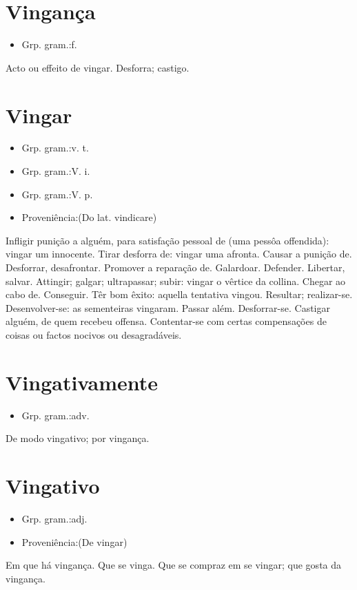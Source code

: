 \documentclass{article}
\begin{document}
\section{Vingança}
\begin{itemize}
\item {Grp. gram.:f.}
\end{itemize}
Acto ou effeito de vingar.
Desforra; castigo.
\section{Vingar}
\begin{itemize}
\item {Grp. gram.:v. t.}
\end{itemize}
\begin{itemize}
\item {Grp. gram.:V. i.}
\end{itemize}
\begin{itemize}
\item {Grp. gram.:V. p.}
\end{itemize}
\begin{itemize}
\item {Proveniência:(Do lat. \textunderscore vindicare\textunderscore )}
\end{itemize}
Infligir punição a alguém, para satisfação pessoal de (uma pessôa offendida): \textunderscore vingar um innocente\textunderscore .
Tirar desforra de: \textunderscore vingar uma afronta\textunderscore .
Causar a punição de.
Desforrar, desafrontar.
Promover a reparação de.
Galardoar.
Defender.
Libertar, salvar.
Attingir; galgar; ultrapassar; subir: \textunderscore vingar o vêrtice da collina\textunderscore .
Chegar ao cabo de.
Conseguir.
Têr bom êxito: \textunderscore aquella tentativa vingou\textunderscore .
Resultar; realizar-se.
Desenvolver-se: \textunderscore as sementeiras vingaram\textunderscore .
Passar além.
Desforrar-se.
Castigar alguém, de quem recebeu offensa.
Contentar-se com certas compensações de coisas ou factos nocivos ou desagradáveis.
\section{Vingativamente}
\begin{itemize}
\item {Grp. gram.:adv.}
\end{itemize}
De modo vingativo; por vingança.
\section{Vingativo}
\begin{itemize}
\item {Grp. gram.:adj.}
\end{itemize}
\begin{itemize}
\item {Proveniência:(De \textunderscore vingar\textunderscore )}
\end{itemize}
Em que há vingança.
Que se vinga.
Que se compraz em se vingar; que gosta da vingança.
\end{document}
